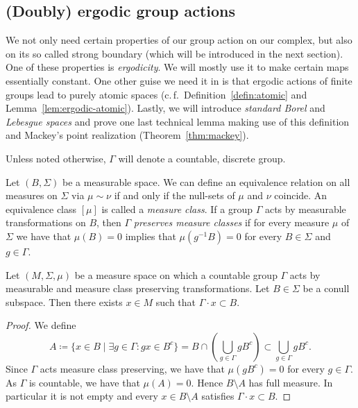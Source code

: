 \subsection{(Doubly) ergodic group actions}
\label{sec:ergodic}

We not only need certain properties of our group action on our complex, but also on its so called strong boundary (which will be introduced in the next section). One of these properties is \emph{ergodicity}. We will mostly use it to make certain maps essentially constant. One other guise we need it in is that ergodic actions of finite groups lead to purely atomic spaces (c.\,f.\ Definition~\ref{defin:atomic} and Lemma~\ref{lem:ergodic-atomic}). Lastly, we will introduce \emph{standard Borel} and \emph{Lebesgue spaces} and prove one last technical lemma making use of this definition and Mackey's point realization (Theorem~\ref{thm:mackey}).

Unless noted otherwise, \(\Gamma\) will denote a countable, discrete group.

\begin{defin}
  Let \((B, \Sigma)\) be a measurable space. We can define an equivalence relation on all measures on \(\Sigma\) via \(\mu \sim \nu\) if and only if the null-sets of \(\mu\) and \(\nu\) coincide. An equivalence class \([\mu]\) is called a \emph{measure class}. If a group \(\Gamma\) acts by measurable transformations on \(B\), then \(\Gamma\) \emph{preserves measure classes} if for every measure \(\mu\) of \(\Sigma\) we have that \(\mu(B) = 0\) implies that \(\mu(g^{-1} B) = 0\) for every \(B \in \Sigma\) and \(g \in \Gamma\).
\end{defin}

\begin{lemma}
  \label{lem:countable-orbit}
  Let \((M, \Sigma, \mu)\) be a measure space on which a countable group \(\Gamma\) acts by measurable and measure class preserving transformations. Let \(B \in \Sigma\) be a conull subspace. Then there exists \(x \in M\) such that \(\Gamma \cdot x \subset B\).
\end{lemma}

\begin{proof}
  We define
  \[
    A \coloneqq \{x \in B \mid \exists g \in \Gamma\colon gx \in B^c\} = B \cap \left( \bigcup_{g \in \Gamma} gB^c\right) \subset \bigcup_{g \in \Gamma} gB^c.
  \]
  Since \(\Gamma\) acts measure class preserving, we have that \(\mu(gB^c) = 0\) for every \(g \in \Gamma\). As \(\Gamma\) is countable, we have that \(\mu(A) = 0\). Hence \(B \setminus A\) has full measure. In particular it is not empty and every \(x \in B \setminus A\) satisfies \(\Gamma \cdot x \subset B\).
\end{proof}

